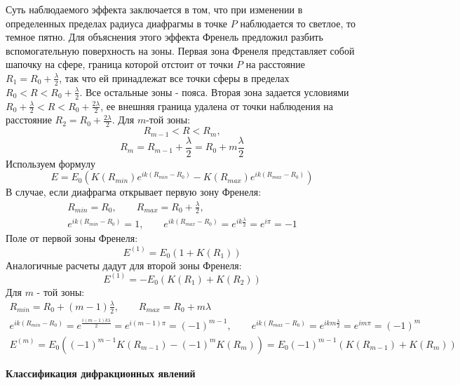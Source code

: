 \documentclass[__main__.tex]{subfiles}
\begin{document}
Суть наблюдаемого эффекта заключается в том, что при изменении в определенных пределах радиуса диафрагмы в точке $P$ наблюдается то светлое, то темное пятно. Для объяснения этого эффекта Френель предложил разбить вспомогательную поверхность на зоны. Первая зона Френеля представляет собой шапочку на сфере, граница которой отстоит от точки $P$ на расстояние $R_1 = R_0 + \frac{\lambda}{2}$, так что ей принадлежат все точки сферы в пределах $R_0 < R < R_0 + \frac{\lambda}{2}$. Все остальные зоны - пояса. Вторая зона задается условиями $R_0 + \frac{\lambda}{2} < R < R_0 + \frac{2\lambda}{2}$, ее внешняя граница удалена от точки наблюдения на расстояние $R_2 = R_0 + \frac{2\lambda}{2}$. Для $m$-той зоны:
$$R_{m-1} < R < R_m,$$
$$R_m = R_{m-1} + \frac{\lambda}{2} = R_0 + m\frac{\lambda}{2}$$
Используем формулу
$$E = E_0\left(K(R_{min}) e^{ik(R_{min} - R_0)} - K(R_{max})e^{ik(R_{max} - R_0)} \right)$$
В случае, если диафрагма открывает первую зону Френеля:
\begin{gather*}
R_{min} = R_0, \qquad R_{max} = R_0 + \frac{\lambda}{2} , \\
e^{ik(R_{min} - R_0)} = 1, \qquad e^{ik(R_{max} - R_0)} = e^{ik\frac{\lambda}{2}} = e^{i\pi} = -1
\end{gather*}
Поле от первой зоны Френеля:
$$E^{(1)} = E_0(1 + K(R_1))$$
Аналогичные расчеты дадут для второй зоны Френеля:
$$E^{(1)} = - E_0(K(R_1) + K(R_2))$$
Для $m$ - той зоны:
\begin{gather*}
R_{min} = R_0 + (m - 1)\frac{\lambda}{2}, \qquad R_{max} = R_0 + m\lambda \\
e^{ik(R_{min} - R_0)} = e^{\frac{i(m-1)k\lambda}{2}} = e^{i(m-1)\pi} = (-1)^{m-1}, \qquad 
e^{ik(R_{max} - R_0)} = e^{ikm\frac{\lambda}{2}} = e^{im\pi} = (-1)^m\\
E^{(m)} = E_0\left((-1)^{m-1} K(R_{m-1}) - (-1)^m K(R_m)\right) = E_0(-1)^{m-1} (K(R_{m-1}) + K(R_m))
\end{gather*} 

\textbf{Классификация дифракционных явлений}\\
\end{document}

